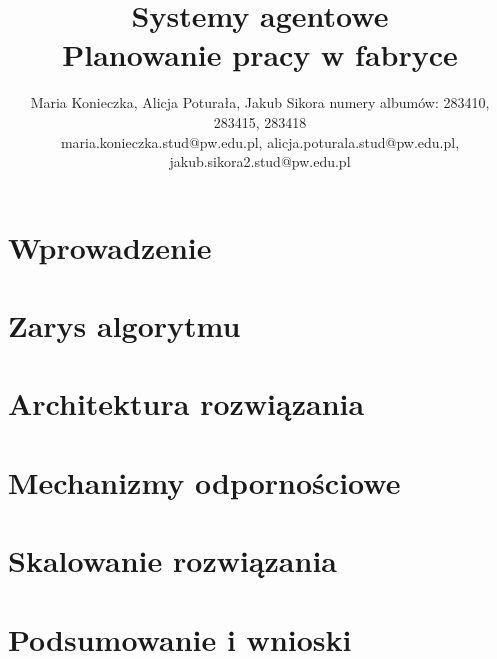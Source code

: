 \documentclass{article}
\title{Systemy agentowe\\ Planowanie pracy w fabryce}
\author{
Maria Konieczka, Alicja Poturała, Jakub Sikora
\affiliations
numery albumów: 283410, 283415, 283418 \\
\emails
maria.konieczka.stud@pw.edu.pl, alicja.poturala.stud@pw.edu.pl, jakub.sikora2.stud@pw.edu.pl
}
\begin{document}
\maketitle

\section{Wprowadzenie}
\label{sec:wprowadzenie}


\section{Zarys algorytmu}
\label{sec:algorytm}


\section{Architektura rozwiązania}
\label{sec:architektura}


\section{Mechanizmy odpornościowe}
\label{sec:recovery}


\section{Skalowanie rozwiązania}
\label{sec:skalowanie}


\section{Podsumowanie i wnioski}
\label{sec:podsumowanie}




\end{document}
